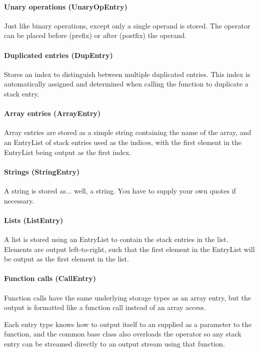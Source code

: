 \paragraph{Unary operations (UnaryOpEntry)}
Just like binary operations, except only a single operand is stored. The operator can be placed before (prefix) or after (postfix) the operand.

\paragraph{Duplicated entries (DupEntry)}
Stores an index to distinguish between multiple duplicated entries. This index is automatically assigned and determined when calling the  function to duplicate a stack entry.

\paragraph{Array entries (ArrayEntry)}
Array entries are stored as a simple string containing the name of the array, and an EntryList of stack entries used as the indices, with the first element in the EntryList being output as the first index.

\paragraph{Strings (StringEntry)}
A string is stored as... well, a string. You have to supply your own quotes if necessary.

\paragraph{Lists (ListEntry)}
A list is stored using an EntryList to contain the stack entries in the list. Elements are output left-to-right, such that the first element in the EntryList will be output as the first element in the list.

\paragraph{Function calls (CallEntry)}
Function calls have the same underlying storage types as an array entry, but the output is formatted like a function call instead of an array access.

Each entry type knows how to output itself to an  supplied as a parameter to the  function, and the common base class  also overloads the \code{<<} operator so any stack entry can be streamed directly to an output stream using that function.

